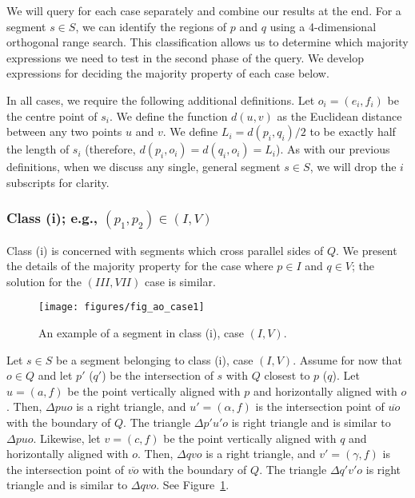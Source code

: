 We will query for each case separately and combine our results at the end. For a segment $s \in S$, we can identify the regions of $p$ and $q$ using a 4-dimensional orthogonal range search. This classification allows us to determine which majority expressions we need to test in the second phase of the query. We develop expressions for deciding the majority property of each case below.

In all cases, we require the following additional definitions. Let $o_i = (e_i, f_i)$ be the centre point of $s_i$.  We define the function $d(u,v)$ as the Euclidean distance between any two points $u$ and $v$. We define $L_i = d(p_i, q_i)/2$ to be exactly half the length of $s_i$ (therefore, $d(p_i, o_i) = d(q_i, o_i) = L_i$). As with our previous definitions, when we discuss any single, general segment $s \in S$, we will drop the $i$ subscripts for clarity.


\subsubsection*{Class (i); e.g., $(p_1, p_2) \in (I, V)$}
\label{:rectangles:ao:class1}

Class (i) is concerned with segments which cross parallel sides of $Q$. We present the details of the majority property for the case where $p \in I$ and $q \in V$; the solution for the $(III, VII)$ case is similar.

\begin{figure}[t]
\begin{center}
  \texttt{[image: figures/fig\_ao\_case1]}
  \caption{An example of a segment in class (i), case $(I, V)$.}
  \label{fig:rectangles:ao:case1}
\end{center}
\end{figure}

Let $s \in S$ be a segment belonging to class (i), case $(I, V)$.
Assume for now that $o \in Q$ and let $p'$ ($q'$) be the intersection of $s$ with $Q$ closest to $p$ ($q$).  
Let $u = (a, f)$ be the point vertically aligned with $p$ and horizontally aligned with $o$. Then, $\Delta p u o$ is a right triangle, and $u' = (\alpha, f)$ is the intersection point of $\overline{u o}$ with the boundary of $Q$.  
The triangle $\Delta p' u' o$ is right triangle and is similar to $\Delta p u o$. 
Likewise, let $v = (c, f)$ be the point vertically aligned with $q$ and horizontally aligned with $o$. Then, $\Delta q v o$ is a right triangle, and $v' = (\gamma, f)$ is the intersection point of $\overline{v o}$ with the boundary of $Q$. The triangle $\Delta q' v' o$ is right triangle and is similar to $\Delta q v o$. See Figure~\ref{fig:rectangles:ao:case1}.

